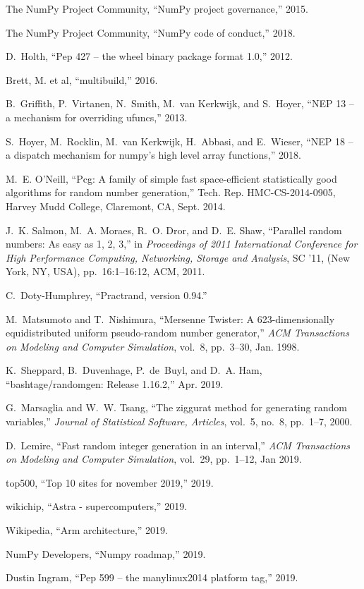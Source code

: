 \documentclass[twocolumn]{article}
\begin{document}
\begin{thebibliography}{10}
{The NumPy Project Community}, ``{NumPy} project governance,'' 2015.

{The NumPy Project Community}, ``{NumPy} code of conduct,'' 2018.

D.~Holth, ``Pep 427 -- the wheel binary package format 1.0,'' 2012.

{Brett, M. et al}, ``{multibuild},'' 2016.

B.~Griffith, P.~Virtanen, N.~Smith, M.~{van Kerkwijk}, and S.~Hoyer, ``{NEP} 13
  -- a mechanism for overriding ufuncs,'' 2013.

S.~Hoyer, M.~Rocklin, M.~{van Kerkwijk}, H.~Abbasi, and E.~Wieser, ``{NEP} 18
  -- a dispatch mechanism for numpy's high level array functions,'' 2018.

M.~E. O'Neill, ``Pcg: A family of simple fast space-efficient statistically
  good algorithms for random number generation,'' Tech. Rep. HMC-CS-2014-0905,
  Harvey Mudd College, Claremont, CA, Sept. 2014.

J.~K. Salmon, M.~A. Moraes, R.~O. Dror, and D.~E. Shaw, ``Parallel random
  numbers: As easy as 1, 2, 3,'' in {\em Proceedings of 2011 International
  Conference for High Performance Computing, Networking, Storage and Analysis},
  SC '11, (New York, NY, USA), pp.~16:1--16:12, ACM, 2011.

C.~Doty-Humphrey, ``Practrand, version 0.94.''

M.~Matsumoto and T.~Nishimura, ``{Mersenne Twister}: A 623-dimensionally
  equidistributed uniform pseudo-random number generator,'' {\em ACM
  Transactions on Modeling and Computer Simulation}, vol.~8, pp.~3--30, Jan.
  1998.

K.~Sheppard, B.~Duvenhage, P.~de~Buyl, and D.~A. Ham, ``bashtage/randomgen:
  Release 1.16.2,'' Apr. 2019.

G.~Marsaglia and W.~W. Tsang, ``The ziggurat method for generating random
  variables,'' {\em Journal of Statistical Software, Articles}, vol.~5, no.~8,
  pp.~1--7, 2000.

D.~Lemire, ``Fast random integer generation in an interval,'' {\em ACM
  Transactions on Modeling and Computer Simulation}, vol.~29, pp.~1--12, Jan
  2019.

{top500}, ``Top 10 sites for november 2019,'' 2019.

{wikichip}, ``Astra - supercomputers,'' 2019.

{Wikipedia}, ``Arm architecture,'' 2019.

{NumPy Developers}, ``Numpy roadmap,'' 2019.

{Dustin Ingram}, ``Pep 599 -- the manylinux2014 platform tag,'' 2019.

\end{thebibliography}
\end{document}
